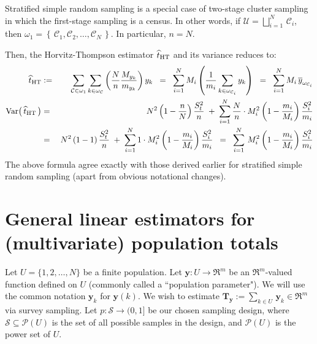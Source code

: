\documentclass{article}
\begin{document}
Stratified simple random sampling is a special case of two-stage cluster sampling in which the first-stage sampling is a census.  In other words, if $\mathcal{U} = \displaystyle{\bigsqcup_{i=1}^{N}}\,\mathcal{C}_{i}$, then $\omega_{1} = \left\{\,\mathcal{C}_{1},\mathcal{C}_{2},\ldots,\mathcal{C}_{N}\,\right\}$.  In particular, $n = N$.

Then, the Horvitz-Thompson estimator $\widehat{t}_{\textnormal{HT}}$ and its variance reduces to:
\begin{eqnarray*}
\widehat{t}_{\textnormal{HT}}
& := & \sum_{\mathcal{C}\in\omega_{1}} \sum_{k\in\omega_{\mathcal{C}}}\left(\dfrac{N}{n}\dfrac{M_{y_{k}}}{m_{y_{k}}}\right)y_{k}
\;\;=\;\;  \sum_{i=1}^{N} M_{i}\left(\dfrac{1}{m_{i}} \sum_{k\in\omega_{\mathcal{C}_{i}}}y_{k}\right) 
\;\;=\;\;  \sum_{i=1}^{N} M_{i}\,\overline{y}_{\omega_{\mathcal{C}_{i}}}
\\
\textnormal{Var}\!\left(\,\widehat{t}_{\textnormal{HT}}\,\right)
& = &
N^{2}\left(1-\dfrac{n}{N}\right)\dfrac{S^{2}_{t}}{n} \; + \; 
\sum^{N}_{i=1}\dfrac{N}{n}\cdot M_{i}^{2}\left(1-\dfrac{m_{i}}{M_{i}}\right)\dfrac{S^{2}_{i}}{m_{i}} \\
& = &
N^{2}\left(1-1\right)\dfrac{S^{2}_{t}}{n} \; + \; 
\sum^{N}_{i=1}1\cdot M_{i}^{2}\left(1-\dfrac{m_{i}}{M_{i}}\right)\dfrac{S^{2}_{i}}{m_{i}}
\;\;=\;\;
\sum^{N}_{i=1}\,M_{i}^{2}\left(1-\dfrac{m_{i}}{M_{i}}\right)\dfrac{S^{2}_{i}}{m_{i}}
\end{eqnarray*}
The above formula agree exactly with those derived earlier for stratified simple random sampling (apart from obvious notational changes).


\section{General linear estimators for (multivariate) population totals}
\setcounter{theorem}{0}

Let $U = \{1,2,\ldots,N\}$ be a finite population.
Let $\mathbf{y} : U \longrightarrow \Re^{m}$ be an $\Re^{m}$-valued function defined on $U$
(commonly called a ``population parameter").
We will use the common notation $\mathbf{y}_{k}$ for $\mathbf{y}(k)$.
We wish to estimate
$\mathbf{T}_{\mathbf{y}} := \underset{k \in U}{\sum}\,\mathbf{y}_{k} \in \Re^{m}$
via survey sampling.
Let $p:\mathcal{S} \longrightarrow (0,1]$ be our chosen sampling design,
where $\mathcal{S} \subseteq \mathcal{P}(U)$ is the set of all possible
samples in the design, and $\mathcal{P}(U)$ is the power set of $U$.
\end{document}
